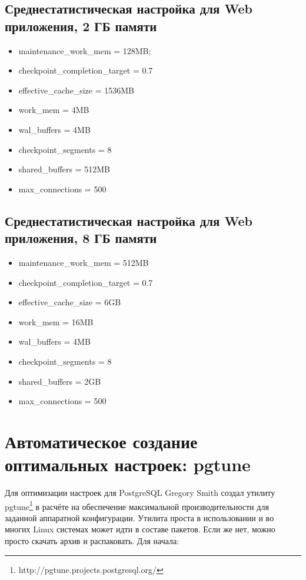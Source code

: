 \subsection{Среднестатистическая настройка для Web приложения, 2 ГБ памяти}

\begin{itemize}
\item maintenance\_work\_mem = 128MB;
\item checkpoint\_completion\_target = 0.7
\item effective\_cache\_size = 1536MB
\item work\_mem = 4MB
\item wal\_buffers = 4MB
\item checkpoint\_segments = 8
\item shared\_buffers = 512MB
\item max\_connections = 500
\end{itemize}

\subsection{Среднестатистическая настройка для Web приложения, 8 ГБ памяти}

\begin{itemize}
\item maintenance\_work\_mem = 512MB
\item checkpoint\_completion\_target = 0.7
\item effective\_cache\_size = 6GB
\item work\_mem = 16MB
\item wal\_buffers = 4MB
\item checkpoint\_segments = 8
\item shared\_buffers = 2GB
\item max\_connections = 500
\end{itemize}

\section{Автоматическое создание оптимальных настроек: pgtune}

Для оптимизации настроек для PostgreSQL Gregory Smith создал утилиту pgtune\footnote{http://pgtune.projects.postgresql.org/} в расчёте на обеспечение максимальной производительности для заданной аппаратной конфигурации. Утилита проста в использовании и во многих Linux системах может идти в составе пакетов. Если же нет, можно просто скачать архив и распаковать. Для начала:


